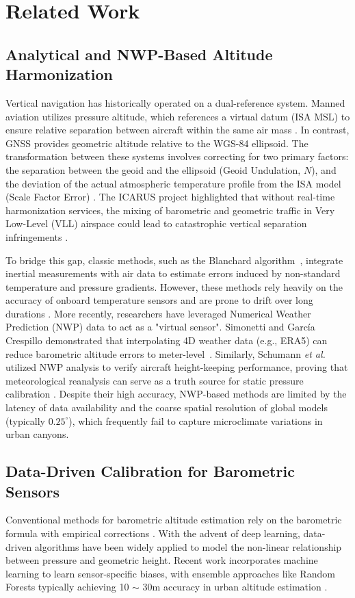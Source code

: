 \section{Related Work}
\label{sec:related_work}

\subsection{Analytical and NWP-Based Altitude Harmonization}
Vertical navigation has historically operated on a dual-reference system. Manned aviation utilizes pressure altitude, which references a virtual datum (ISA MSL) to ensure relative separation between aircraft within the same air mass \cite{SIDs_2022}. In contrast, GNSS provides geometric altitude relative to the WGS-84 ellipsoid. The transformation between these systems involves correcting for two primary factors: the separation between the geoid and the ellipsoid (Geoid Undulation, $N$), and the deviation of the actual atmospheric temperature profile from the ISA model (Scale Factor Error) \cite{navi_637}. The ICARUS project highlighted that without real-time harmonization services, the mixing of barometric and geometric traffic in Very Low-Level (VLL) airspace could lead to catastrophic vertical separation infringements \cite{SIDs_2022}.

To bridge this gap, classic methods, such as the Blanchard algorithm~\cite{blanchard1971new}, integrate inertial measurements with air data to estimate errors induced by non-standard temperature and pressure gradients. However, these methods rely heavily on the accuracy of onboard temperature sensors and are prone to drift over long durations \cite{li2010errors}. More recently, researchers have leveraged Numerical Weather Prediction (NWP) data to act as a "virtual sensor". Simonetti and Garc\'{i}a Crespillo demonstrated that interpolating 4D weather data (e.g., ERA5) can reduce barometric altitude errors to meter-level~\cite{navi_637}. Similarly, Schumann \textit{et al.} utilized NWP analysis to verify aircraft height-keeping performance, proving that meteorological reanalysis can serve as a truth source for static pressure calibration \cite{Schumann_2017}. Despite their high accuracy, NWP-based methods are limited by the latency of data availability and the coarse spatial resolution of global models (typically $0.25^\circ$), which frequently fail to capture microclimate variations in urban canyons.

\subsection{Data-Driven Calibration for Barometric Sensors}
Conventional methods for barometric altitude estimation rely on the barometric formula with empirical corrections \cite{icao1993manual}. With the advent of deep learning, data-driven algorithms have been widely applied to model the non-linear relationship between pressure and geometric height. Recent work incorporates machine learning to learn sensor-specific biases, with ensemble approaches like Random Forests typically achieving 10 $\sim$ 30m accuracy in urban altitude estimation \cite{zhang2020urban}.

